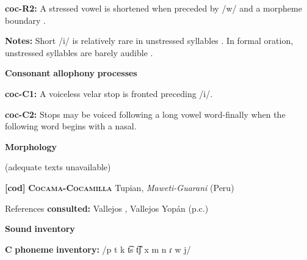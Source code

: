 \documentclass[output=paper]{langsci/langscibook}
\begin{document}
\begin{styleBody}
\textbf{coc-R2:} A stressed vowel is shortened when preceded by /w/ and a morpheme boundary \citep[67]{Bendixen1980}.
\end{styleBody}

\begin{styleBody}
\textbf{Notes:} Short /i/ is relatively rare in unstressed syllables \citep[32]{Crawford1966}. In formal oration, unstressed syllables are barely audible \citep[332-3]{Bendixen1980}.
\end{styleBody}

\begin{styleBody}
\textbf{Consonant} \textbf{allophony} \textbf{processes}
\end{styleBody}

\begin{styleBody}
\textbf{coc-C1:} A voiceless velar stop is fronted preceding /i/. \citep[15]{Crawford1966}
\end{styleBody}

\begin{styleBody}
\textbf{coc-C2:} Stops may be voiced following a long vowel word-finally when the following word begins with a nasal. \citep[99-100]{Bendixen1980}
\end{styleBody}

\begin{styleBody}
\textbf{Morphology}
\end{styleBody}

\begin{styleBody}
(adequate texts unavailable)
\end{styleBody}

\begin{styleBody}
\textbf{[cod]}   \textbf{\textsc{Cocama-Cocamilla}}  Tupian, \textit{Maweti-Guarani} (Peru)
\end{styleBody}

\begin{styleBody}
References \textbf{consulted:} Vallejos \citet{Yopán2010}, Vallejos Yopán (p.c.)
\end{styleBody}

\begin{styleBody}
\textbf{Sound} \textbf{inventory}
\end{styleBody}

\begin{styleBody}
\textbf{C} \textbf{phoneme} \textbf{inventory:} /p t k t͡s t͡ʃ x m n ɾ w j/
\end{styleBody}
\end{document}
